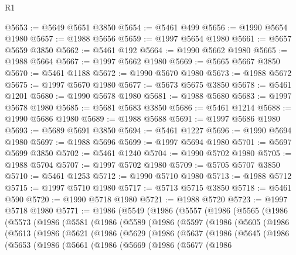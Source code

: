 \begin{lexlean}{R1}
\begin{coremodule}
@5653 := @5649 @5651 @3850
@5654 := @5461 @499
@5656 := @1990 @5654 @1980
@5657 := @1988 @5656
@5659 := @1997 @5654 @1980
@5661 := @5657 @5659 @3850
@5662 := @5461 @192
@5664 := @1990 @5662 @1980
@5665 := @1988 @5664
@5667 := @1997 @5662 @1980
@5669 := @5665 @5667 @3850
@5670 := @5461 @1188
@5672 := @1990 @5670 @1980
@5673 := @1988 @5672
@5675 := @1997 @5670 @1980
@5677 := @5673 @5675 @3850
@5678 := @5461 @1201
@5680 := @1990 @5678 @1980
@5681 := @1988 @5680
@5683 := @1997 @5678 @1980
@5685 := @5681 @5683 @3850
@5686 := @5461 @1214
@5688 := @1990 @5686 @1980
@5689 := @1988 @5688
@5691 := @1997 @5686 @1980
@5693 := @5689 @5691 @3850
@5694 := @5461 @1227
@5696 := @1990 @5694 @1980
@5697 := @1988 @5696
@5699 := @1997 @5694 @1980
@5701 := @5697 @5699 @3850
@5702 := @5461 @1240
@5704 := @1990 @5702 @1980
@5705 := @1988 @5704
@5707 := @1997 @5702 @1980
@5709 := @5705 @5707 @3850
@5710 := @5461 @1253
@5712 := @1990 @5710 @1980
@5713 := @1988 @5712
@5715 := @1997 @5710 @1980
@5717 := @5713 @5715 @3850
@5718 := @5461 @590
@5720 := @1990 @5718 @1980
@5721 := @1988 @5720
@5723 := @1997 @5718 @1980
@5771 := @1986
    (@5549
      (@1986
        (@5557
          (@1986
            (@5565
              (@1986
                (@5573
                  (@1986
                    (@5581
                      (@1986
                        (@5589
                          (@1986
                            (@5597
                              (@1986
                                (@5605
                                  (@1986
                                    (@5613
                                      (@1986
                                        (@5621
                                          (@1986
                                            (@5629
                                              (@1986
                                                (@5637
                                                  (@1986
                                                    (@5645
                                                      (@1986
                                                        (@5653
                                                          (@1986
                                                            (@5661
                                                              (@1986
                                                                (@5669
                                                                  (@1986
                                                                    (@5677
                                                                      (@1986

\end{coremodule}
\end{lexlean}
